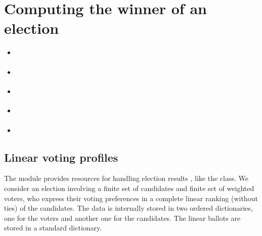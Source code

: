 \documentclass[a4paper,12pt,english]{sphinxhowto}
\begin{document}
\section{Computing the winner of an election}
\label{\detokenize{tutorial:computing-the-winner-of-an-election}}\label{\detokenize{tutorial:linearvoting-tutorial-label}}
\begin{sphinxShadowBox}
\begin{itemize}
\item {} 
\label{\detokenize{tutorial:id174}}{\hyperref[\detokenize{tutorial:linear-voting-profiles}]{}}

\item {} 
\label{\detokenize{tutorial:id175}}{\hyperref[\detokenize{tutorial:computing-the-winner}]{}}

\item {} 
\label{\detokenize{tutorial:id176}}{\hyperref[\detokenize{tutorial:the-condorcet-winner}]{}}

\item {} 
\label{\detokenize{tutorial:id177}}{\hyperref[\detokenize{tutorial:cyclic-social-preferences}]{}}

\item {} 
\label{\detokenize{tutorial:id178}}{\hyperref[\detokenize{tutorial:on-generating-random-linear-voting-profiles}]{}}

\end{itemize}
\end{sphinxShadowBox}


\subsection{Linear voting profiles}
\label{\detokenize{tutorial:linear-voting-profiles}}
The  module provides resources for handling election results , like the  class. We consider an election involving a finite set of candidates and finite set of weighted voters, who express their voting preferences in a complete linear ranking (without ties) of the candidates. The data is internally stored in two ordered dictionaries, one for the voters and another one for the candidates. The linear ballots are stored in a standard dictionary.
\end{document}
